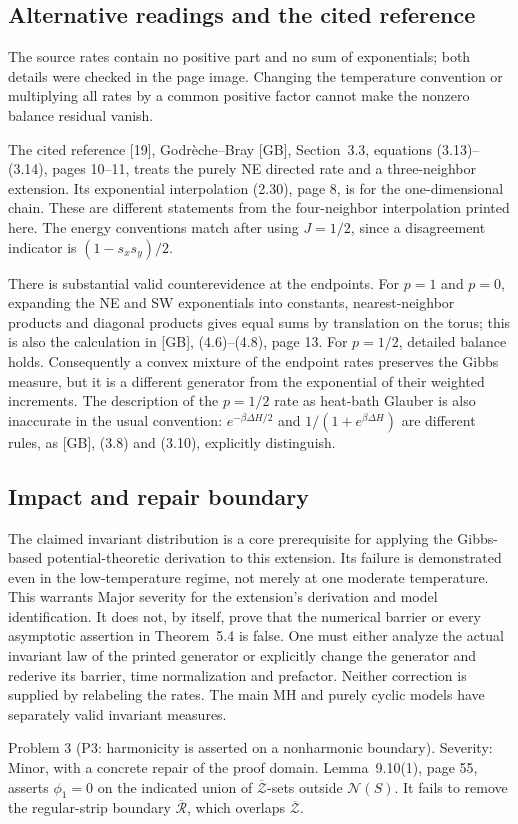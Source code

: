 \documentclass[10pt]{article}
\begin{document}
\subsection*{Alternative readings and the cited reference}
The source rates contain no positive part and no sum of exponentials; both details were checked in the page image. Changing the temperature convention or multiplying all rates by a common positive factor cannot make the nonzero balance residual vanish.\par
The cited reference [19], Godrèche–Bray [GB], Section 3.3, equations (3.13)–(3.14), pages 10–11, treats the purely NE directed rate and a three-neighbor extension. Its exponential interpolation (2.30), page 8, is for the one-dimensional chain. These are different statements from the four-neighbor interpolation printed here. The energy conventions match after using \(J=1/2\), since a disagreement indicator is \((1-s_xs_y)/2\).\par
There is substantial valid counterevidence at the endpoints. For \(p=1\) and \(p=0\), expanding the NE and SW exponentials into constants, nearest-neighbor products and diagonal products gives equal sums by translation on the torus; this is also the calculation in [GB], (4.6)–(4.8), page 13. For \(p=1/2\), detailed balance holds. Consequently a convex mixture of the endpoint rates preserves the Gibbs measure, but it is a different generator from the exponential of their weighted increments. The description of the \(p=1/2\) rate as heat-bath Glauber is also inaccurate in the usual convention: \(e^{-\beta\Delta H/2}\) and \(1/(1+e^{\beta\Delta H})\) are different rules, as [GB], (3.8) and (3.10), explicitly distinguish.\par
\subsection*{Impact and repair boundary}
The claimed invariant distribution is a core prerequisite for applying the Gibbs-based potential-theoretic derivation to this extension. Its failure is demonstrated even in the low-temperature regime, not merely at one moderate temperature. This warrants Major severity for the extension’s derivation and model identification. It does not, by itself, prove that the numerical barrier or every asymptotic assertion in Theorem 5.4 is false. One must either analyze the actual invariant law of the printed generator or explicitly change the generator and rederive its barrier, time normalization and prefactor. Neither correction is supplied by relabeling the rates. The main MH and purely cyclic models have separately valid invariant measures.\par
Problem 3 (P3: harmonicity is asserted on a nonharmonic boundary).  Severity: Minor, with a concrete repair of the proof domain. Lemma 9.10(1), page 55, asserts \(\phi_1=0\) on the indicated union of \(\overline{\mathcal Z}\)-sets outside \(\mathcal N(S)\). It fails to remove the regular-strip boundary \(\overline{\mathcal R}\), which overlaps \(\overline{\mathcal Z}\).\par
\end{document}
